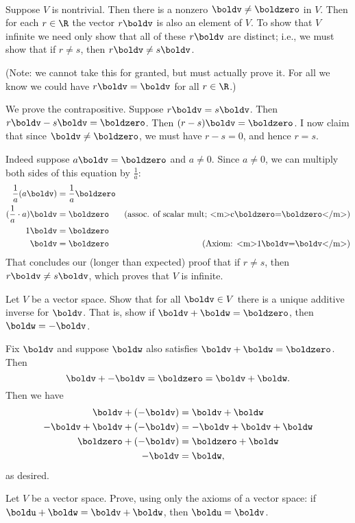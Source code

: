 \\
\begin{solution}
Suppose $V$ is nontrivial. Then there is a nonzero $\boldv\ne \boldzero$ in $V$. Then for each $r\in\R$ the vector $r\boldv$ is also an element of $V$. To show that $V$ infinite we need only show that all of these $r\boldv$ are distinct; i.e., we must show that if $r\ne s$, then $r\boldv\ne s\boldv$. 

(Note: we cannot take this for granted, but must actually prove it. For all we know we could have $r\boldv=\boldv$ for all $r\in\R$.) 

We prove the contrapositive. Suppose $r\boldv=s\boldv$. Then $r\boldv-s\boldv=\boldzero$. Then $(r-s)\boldv=\boldzero$. I now claim that since $\boldv\ne\boldzero$, we must have $r-s=0$, and hence $r=s$. 

Indeed suppose $a\boldv=\boldzero$ and $a\ne 0$. Since $a\ne 0$, we can multiply both sides of this equation by $\frac{1}{a}$:
\begin{align*}
\frac{1}{a}(a\boldv)&=\frac{1}{a}\boldzero\\
(\frac{1}{a}\cdot a)\boldv&=\boldzero &\text{(assoc. of scalar mult; <m>c\boldzero=\boldzero</m>)}\\
1\boldv&=\boldzero\\
\boldv&=\boldzero &\text{(Axiom: <m>1\boldv=\boldv</m>)}
\end{align*}
That concludes our (longer than expected) proof that if $r\ne s$, then $r\boldv\ne s\boldv$, which proves that $V$ is infinite. 
\end{solution}
\ii Let $V$ be a vector space. Show that for all $\boldv\in V$ there is a unique additive inverse for $\boldv$. That is, show if $\boldv+\boldw=\boldzero$, then $\boldw=-\boldv$.  
\\
\begin{solution}
Fix $\boldv$ and suppose $\boldw$ also satisfies $\boldv+\boldw=\boldzero$. Then  
\[
\boldv+-\boldv=\boldzero=\boldv+\boldw.
\]
Then we have 
\begin{align*}
\boldv+(-\boldv)&=\boldv+\boldw\\
-\boldv+\boldv+(-\boldv)&=-\boldv+\boldv+\boldw\\
\boldzero+(-\boldv)&=\boldzero+\boldw\\
-\boldv&=\boldw,
\end{align*}
as desired. 
\end{solution}
\ii Let $V$ be a vector space. Prove, using only the axioms of a vector space: if $\boldu + \boldw = \boldv + \boldw$, then $\boldu = \boldv$.
